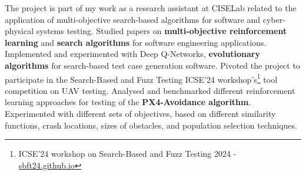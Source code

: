    \vspace{6pt}
    \small{\newline{} The project is part of my work as a research assistant at CISELab related to the application of multi-objective search-based algorithms for software and cyber-physical systems testing.}
    \vspace{-4pt}
        \resumeItemListStart
            \subItemOfItem
            {Studied papers on \textbf{multi-objective reinforcement learning} and \textbf{search algorithms} for software engineering applications.}
            \subItemOfItem
            {Implemented and experimented with Deep Q-Networks, \textbf{evolutionary algorithms} for search-based test case generation software.}
            \subItemOfItem
            {Pivoted the project to participate in the Search-Based and Fuzz Testing ICSE’24 workshop's\footnote{ICSE’24 workshop on Search-Based and Fuzz Testing 2024 - \href{https://sbft24.github.io/}{sbft24.github.io}} tool competition on UAV testing.}
            \subItemOfItem
            {Analysed and benchmarked different reinforcement learning approaches for testing of the \textbf{PX4-Avoidance algorithm}.}
            \subItemOfItem
            {Experimented with different sets of objectives, based on different similarity functions, crash locations, sizes of obstacles, and population selection techniques.}          
        \resumeItemListEnd